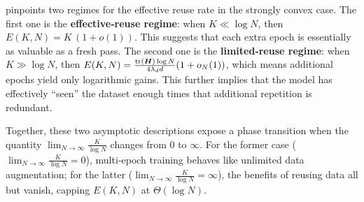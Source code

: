
\vspace{-0.1in}
 pinpoints two regimes for the effective reuse rate in the strongly convex case. 
The first one is the \textbf{effective‐reuse regime}: when $K \ll \log N$, then $E(K,N)=K\,(1+ o(1))$. This suggests that each extra epoch is essentially as valuable as a fresh pass. 
The second one is the \textbf{limited‐reuse regime}: when $K \gg \log N$, then $E(K,N)=\frac{\mathrm{tr}({\bm{H}})\log N}{4\lambda_d d}(1+o_N(1))$, which means additional epochs yield only logarithmic gains. This further implies that the model has effectively “seen” the dataset enough times that additional repetition is redundant.


Together, these two asymptotic descriptions expose a phase transition when the quantity $\lim_{N \to \infty} \frac{K}{\log N}$ changes from $0$ to $\infty$.  For the former case ($\lim_{N \to \infty} \frac{K}{\log N} = 0$), multi‐epoch training behaves like unlimited data augmentation; for the latter ($\lim_{N \to \infty} \frac{K}{\log N} = \infty$),
the benefits of reusing data all but vanish, capping $E(K,N)$ at $\Theta(\log N)$.

